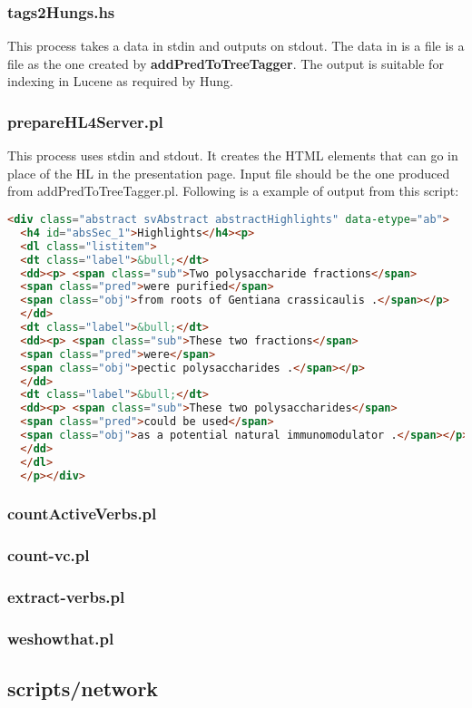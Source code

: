 \documentclass[a4paper,11pt]{report}
\newcommand{\cs}[1]{{\bfseries \ttfamily #1}}
\begin{document}
\subsubsection{tags2Hungs.hs}
This process takes a data in stdin and outputs on stdout. The data in is a file is a file as the one created by \cs{addPredToTreeTagger}. The output is suitable for indexing in Lucene as required by Hung.
\subsubsection{prepareHL4Server.pl}
This process uses stdin and stdout. 
It creates the HTML elements that can go in place of the HL in the presentation page. Input file should be the one produced from addPredToTreeTagger.pl. Following is a example of output from this script:
\begin{lstlisting}[language=HTML]
  <div class="abstract svAbstract abstractHighlights" data-etype="ab">
  <h4 id="absSec_1">Highlights</h4><p>
  <dl class="listitem">
  <dt class="label">&bull;</dt>
  <dd><p> <span class="sub">Two polysaccharide fractions</span>
  <span class="pred">were purified</span>
  <span class="obj">from roots of Gentiana crassicaulis .</span></p>
  </dd>
  <dt class="label">&bull;</dt>
  <dd><p> <span class="sub">These two fractions</span>
  <span class="pred">were</span>
  <span class="obj">pectic polysaccharides .</span></p>
  </dd>
  <dt class="label">&bull;</dt>
  <dd><p> <span class="sub">These two polysaccharides</span>
  <span class="pred">could be used</span>
  <span class="obj">as a potential natural immunomodulator .</span></p>
  </dd>
  </dl>
  </p></div>
\end{lstlisting}
\subsubsection{countActiveVerbs.pl}
\subsubsection{count-vc.pl}
\subsubsection{extract-verbs.pl}
\subsubsection{weshowthat.pl}
%
%
\subsection{scripts/network}
\end{document}

